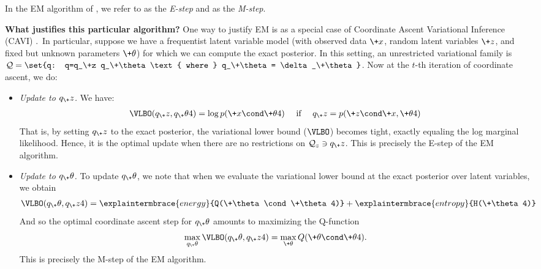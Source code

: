 \documentclass{article} %
\newcommand{\param}{\+\theta}
\begin{document}
In the EM algorithm of 
, we refer to  as the \textit{E-step} and  as the \textit{M-step}.

\textbf{What justifies this particular algorithm?}  One way to justify EM is as a special case of Coordinate Ascent Variational Inference (CAVI) \cite{wojnowiczXXXXvariational}.\footnotemark~In particular, suppose we have a frequentist latent variable model (with observed data $\+x$, random latent variables $\+z$, and fixed but unknown parameters $\param$) for which we can compute the exact posterior.  In this setting, an unrestricted variational family is $\mathcal{Q} = \set{q: q=q_\+z q_\param \text{ where } q_\param = \delta_\param}$.  Now at the $t$-th iteration of coordinate ascent, we do:


\begin{itemize}
\item \textit{Update to $q_\+z$.} We have:
%
\begin{align}
\VLBO(q_\+z, q_\param^^t) = \log p(\+x \cond \param^^t) \quad \text{ if } \quad 	q_\+z=p(\+z \cond \+x, \param^^t)
\end{align}
%
That is, by setting $q_\+z$ to the exact posterior, the variational lower bound ($\VLBO$) becomes tight, exactly equaling the log marginal likelihood. Hence, it is the optimal update when there are no restrictions on $\mathcal{Q}_z \ni q_\+z$.  This is precisely the E-step of the EM algorithm.

\item \textit{Update to $q_\param$.}	 To update $q_\param$, we note that when we evaluate the variational lower bound at the exact posterior over latent variables, we obtain
%
\begin{align}
\VLBO(q_\param, q_\+z^^t) = \explaintermbrace{energy}{Q(\param \cond \param^^t)} + \explaintermbrace{entropy}{H(\param^^t)}
\end{align}
%
And so the optimal coordinate ascent step for $q_\param$ amounts to maximizing the Q-function
%
\begin{align}
\max_{q_\param} \VLBO(q_\param, q_\+z^^t) = \max_{\param}  Q(\param \cond \param^^t). 
\end{align}
%
This is precisely the M-step of the EM algorithm.
\end{itemize}
%
\end{document}
